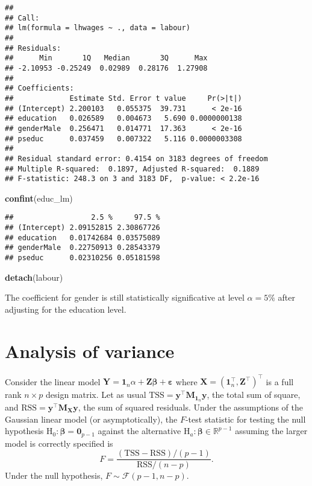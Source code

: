 \documentclass[]{book}
\newenvironment{Shaded}{\begin{snugshade}}{\end{snugshade}}
\newcommand{\KeywordTok}[1]{\textcolor[rgb]{0.13,0.29,0.53}{\textbf{#1}}}
\newcommand{\NormalTok}[1]{#1}
\theoremstyle{definition}
\theoremstyle{definition}
\theoremstyle{definition}
\theoremstyle{remark}
\begin{document}
\begin{verbatim}
## 
## Call:
## lm(formula = lhwages ~ ., data = labour)
## 
## Residuals:
##      Min       1Q   Median       3Q      Max 
## -2.10953 -0.25249  0.02989  0.28176  1.27908 
## 
## Coefficients:
##             Estimate Std. Error t value     Pr(>|t|)
## (Intercept) 2.200103   0.055375  39.731      < 2e-16
## education   0.026589   0.004673   5.690 0.0000000138
## genderMale  0.256471   0.014771  17.363      < 2e-16
## pseduc      0.037459   0.007322   5.116 0.0000003308
## 
## Residual standard error: 0.4154 on 3183 degrees of freedom
## Multiple R-squared:  0.1897, Adjusted R-squared:  0.1889 
## F-statistic: 248.3 on 3 and 3183 DF,  p-value: < 2.2e-16
\end{verbatim}

\begin{Shaded}
\begin{Highlighting}[]
\KeywordTok{confint}\NormalTok{(educ_lm)}
\end{Highlighting}
\end{Shaded}

\begin{verbatim}
##                  2.5 %     97.5 %
## (Intercept) 2.09152815 2.30867726
## education   0.01742684 0.03575089
## genderMale  0.22750913 0.28543379
## pseduc      0.02310256 0.05181598
\end{verbatim}

\begin{Shaded}
\begin{Highlighting}[]
\KeywordTok{detach}\NormalTok{(labour)}
\end{Highlighting}
\end{Shaded}

The coefficient for gender is still statistically significative at level \(\alpha=5\%\) after adjusting for the education level.

\hypertarget{analysis-of-variance}{%
\chapter{Analysis of variance}\label{analysis-of-variance}}

Consider the linear model \(\boldsymbol{Y} = \mathbf{1}_n\alpha + \mathbf{Z}\boldsymbol{\beta} + \boldsymbol{\varepsilon}\)
where \(\mathbf{X}=(\mathbf{1}_n^\top, \mathbf{Z}^\top)^\top\) is a full rank \(n \times p\) design matrix.
Let as usual \(\mathrm{TSS} = \boldsymbol{y}^\top\mathbf{M}_{\mathbf{1}_n}\boldsymbol{y}\), the total sum of square, and \(\mathrm{RSS}= \boldsymbol{y}^\top\mathbf{M}_{\mathbf{X}}\boldsymbol{y}\), the sum of squared residuals.
Under the assumptions of the Gaussian linear model (or asymptotically), the \(F\)-test statistic for testing the null hypothesis \(\mathrm{H}_0: \boldsymbol{\beta}=\mathbf{0}_{p-1}\) against the alternative \(\mathrm{H}_a: \boldsymbol{\beta} \in \mathbb{R}^{p-1}\) assuming the larger model is correctly specified is
\[F = \frac{(\mathrm{TSS}-\mathrm{RSS})/(p-1)}{\mathrm{RSS}/(n-p)}.\]
Under the null hypothesis, \(F \sim \mathcal{F}(p-1, n-p)\).
\end{document}
